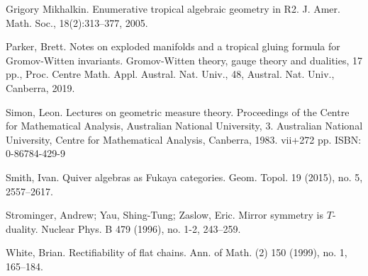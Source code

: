 \documentclass{article}
\theoremstyle{definition}
\begin{document}
		
		Grigory Mikhalkin. Enumerative tropical algebraic geometry in R2. J. Amer.
		Math. Soc., 18(2):313–377, 2005.
		
		
		
		
		Parker, Brett. Notes on exploded manifolds and a tropical gluing formula for Gromov-Witten invariants. Gromov-Witten theory, gauge theory and dualities, 17 pp., Proc. Centre Math. Appl. Austral. Nat. Univ., 48, Austral. Nat. Univ., Canberra, 2019.

		
		
		
   Simon, Leon. Lectures on geometric measure theory. Proceedings of the Centre for Mathematical Analysis, Australian National University, 3. Australian National University, Centre for Mathematical Analysis, Canberra, 1983. {\rm vii}+272 pp. ISBN: 0-86784-429-9
		

Smith, Ivan. Quiver algebras as Fukaya categories. Geom. Topol. 19 (2015), no. 5, 2557--2617.
		
		
		  Strominger, Andrew; Yau, Shing-Tung; Zaslow, Eric. Mirror symmetry is $T$-duality. Nuclear Phys. B 479 (1996), no. 1-2, 243--259.
		
		
		 White, Brian. Rectifiability of flat chains. Ann. of Math. (2) 150 (1999), no. 1, 165--184.

		
		
		
	
\end{document}

